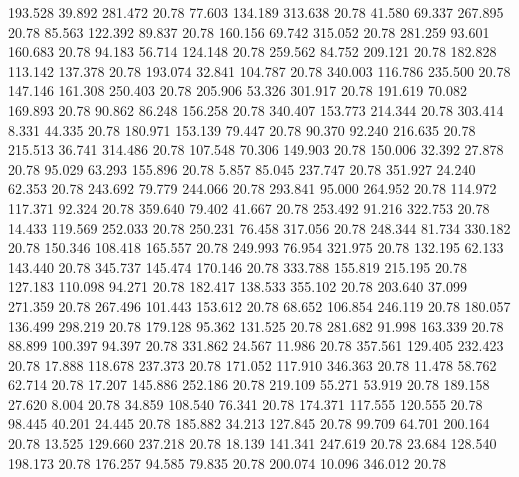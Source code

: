  193.528   39.892  281.472        20.78
  77.603  134.189  313.638        20.78
  41.580   69.337  267.895        20.78
  85.563  122.392   89.837        20.78
 160.156   69.742  315.052        20.78
 281.259   93.601  160.683        20.78
  94.183   56.714  124.148        20.78
 259.562   84.752  209.121        20.78
 182.828  113.142  137.378        20.78
 193.074   32.841  104.787        20.78
 340.003  116.786  235.500        20.78
 147.146  161.308  250.403        20.78
 205.906   53.326  301.917        20.78
 191.619   70.082  169.893        20.78
  90.862   86.248  156.258        20.78
 340.407  153.773  214.344        20.78
 303.414    8.331   44.335        20.78
 180.971  153.139   79.447        20.78
  90.370   92.240  216.635        20.78
 215.513   36.741  314.486        20.78
 107.548   70.306  149.903        20.78
 150.006   32.392   27.878        20.78
  95.029   63.293  155.896        20.78
   5.857   85.045  237.747        20.78
 351.927   24.240   62.353        20.78
 243.692   79.779  244.066        20.78
 293.841   95.000  264.952        20.78
 114.972  117.371   92.324        20.78
 359.640   79.402   41.667        20.78
 253.492   91.216  322.753        20.78
  14.433  119.569  252.033        20.78
 250.231   76.458  317.056        20.78
 248.344   81.734  330.182        20.78
 150.346  108.418  165.557        20.78
 249.993   76.954  321.975        20.78
 132.195   62.133  143.440        20.78
 345.737  145.474  170.146        20.78
 333.788  155.819  215.195        20.78
 127.183  110.098   94.271        20.78
 182.417  138.533  355.102        20.78
 203.640   37.099  271.359        20.78
 267.496  101.443  153.612        20.78
  68.652  106.854  246.119        20.78
 180.057  136.499  298.219        20.78
 179.128   95.362  131.525        20.78
 281.682   91.998  163.339        20.78
  88.899  100.397   94.397        20.78
 331.862   24.567   11.986        20.78
 357.561  129.405  232.423        20.78
  17.888  118.678  237.373        20.78
 171.052  117.910  346.363        20.78
  11.478   58.762   62.714        20.78
  17.207  145.886  252.186        20.78
 219.109   55.271   53.919        20.78
 189.158   27.620    8.004        20.78
  34.859  108.540   76.341        20.78
 174.371  117.555  120.555        20.78
  98.445   40.201   24.445        20.78
 185.882   34.213  127.845        20.78
  99.709   64.701  200.164        20.78
  13.525  129.660  237.218        20.78
  18.139  141.341  247.619        20.78
  23.684  128.540  198.173        20.78
 176.257   94.585   79.835        20.78
 200.074   10.096  346.012        20.78
